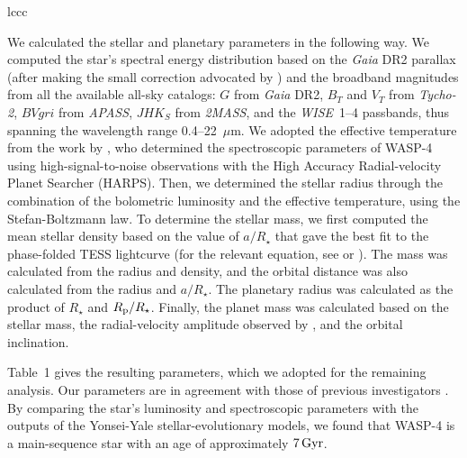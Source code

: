 \documentclass[12pt,twocolumn,tighten]{aastex62}
\begin{document}
\begin{deluxetable}{lccc}

\end{deluxetable}

We calculated the stellar and planetary parameters in the following
way.  We computed the star's spectral energy distribution based on the
{\it Gaia} DR2 parallax (after making the small correction advocated
by \citealt{stassun_evidence_2018}) and the broadband magnitudes from
all the available all-sky catalogs: $G$ from {\it Gaia\/} DR2, $B_T$
and $V_T$ from {\it Tycho-2}, $BVgri$ from {\it APASS}, $JHK_S$ from
{\it 2MASS}, and the {\it WISE}~1--4 passbands, thus spanning the
wavelength range 0.4--22~$\mu$m.  We adopted the effective temperature
from the work by \citet{doyle_accurate_2013}, who determined the
spectroscopic parameters of WASP-4 using high-signal-to-noise
observations with the High Accuracy Radial-velocity Planet Searcher
(HARPS).  Then, we determined the stellar radius through the
combination of the bolometric luminosity and the effective
temperature, using the Stefan-Boltzmann law.  To determine the stellar
mass, we first computed the mean stellar density based on the value of
$a/R_\star$ that gave the best fit to the phase-folded TESS lightcurve
(for the relevant equation, see \citealt{seager_unique_2003} or
\citealt{winn_exoplanet_2010}).  The mass was calculated from the
radius and density, and the orbital distance was also calculated from
the radius and $a/R_\star$.  The planetary radius was calculated as
the product of $R_\star$ and $R_{\rm p}/R_\star$.  Finally, the planet
mass was calculated based on the stellar mass, the radial-velocity
amplitude observed by \citet{triaud_spin-orbit_2010}, and the orbital
inclination.

Table~1 gives the resulting parameters, which we adopted for the
remaining analysis.  Our parameters are in agreement with those of
previous investigators
\citep{wilson_wasp-4b_2008,gillon_discovery_2009,winn_transit_2009,southworth_homogeneous_2011,petrucci_no_2013}.
By comparing the star's luminosity and spectroscopic parameters with
the outputs of the Yonsei-Yale stellar-evolutionary models, we found
that WASP-4 is a main-sequence star with an age of approximately
$7\,{\rm Gyr}$.
\end{document}
